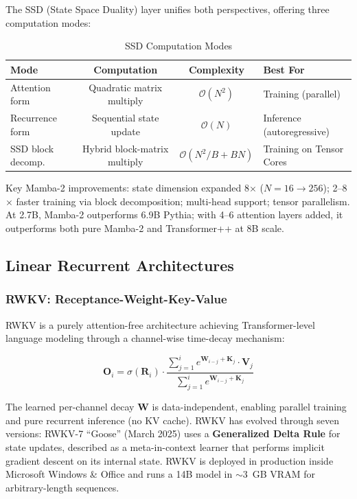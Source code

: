\documentclass[11pt,a4paper]{article}
\begin{document}
The SSD (State Space Duality) layer unifies both perspectives, offering three computation modes:

\begin{table}[H]
\centering
\caption{SSD Computation Modes}
\begin{tabular}{@{}lccp{5cm}@{}}
\toprule
\textbf{Mode} & \textbf{Computation} & \textbf{Complexity} & \textbf{Best For} \\
\midrule
Attention form & Quadratic matrix multiply & $\mathcal{O}(N^2)$ & Training (parallel) \\
Recurrence form & Sequential state update & $\mathcal{O}(N)$ & Inference (autoregressive) \\
SSD block decomp. & Hybrid block-matrix multiply & $\mathcal{O}(N^2/B + BN)$ & Training on Tensor Cores \\
\bottomrule
\end{tabular}
\end{table}

Key Mamba-2 improvements: state dimension expanded 8$\times$ ($N = 16 \to 256$); 2--8$\times$ faster training via block decomposition; multi-head support; tensor parallelism. At 2.7B, Mamba-2 outperforms 6.9B Pythia; with 4--6 attention layers added, it outperforms both pure Mamba-2 and Transformer++ at 8B scale.

\subsection{Linear Recurrent Architectures}

\subsubsection{RWKV: Receptance-Weight-Key-Value}

RWKV is a purely attention-free architecture achieving Transformer-level language modeling through a channel-wise time-decay mechanism:

\begin{equation}
\mathbf{O}_i = \sigma(\mathbf{R}_i) \cdot \frac{\sum_{j=1}^{i} e^{\mathbf{W}_{i-j} + \mathbf{K}_j} \cdot \mathbf{V}_j}{\sum_{j=1}^{i} e^{\mathbf{W}_{i-j} + \mathbf{K}_j}}
\end{equation}

The learned per-channel decay $\mathbf{W}$ is data-independent, enabling parallel training and pure recurrent inference (no KV cache). RWKV has evolved through seven versions: RWKV-7 ``Goose'' (March 2025) uses a \textbf{Generalized Delta Rule} for state updates, described as a meta-in-context learner that performs implicit gradient descent on its internal state. RWKV is deployed in production inside Microsoft Windows \& Office and runs a 14B model in $\sim$3~GB VRAM for arbitrary-length sequences.
\end{document}
